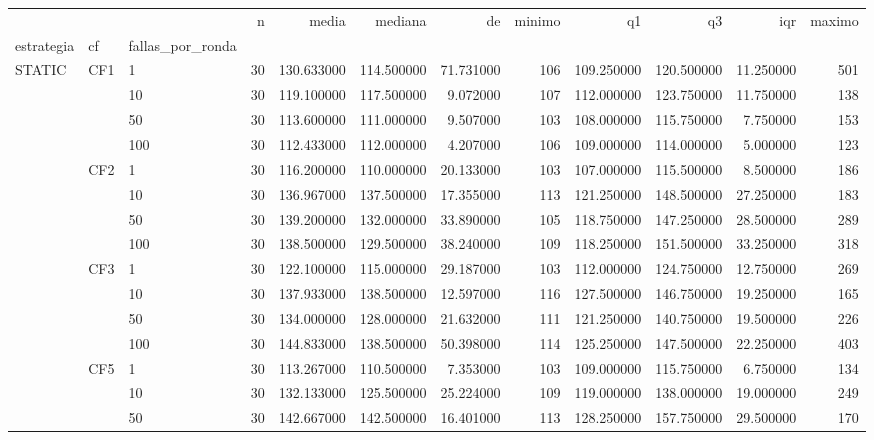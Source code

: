 \begin{tabular}{lllrrrrrrrrr}
\toprule
 &  &  & n & media & mediana & de & minimo & q1 & q3 & iqr & maximo \\
estrategia & cf & fallas_por_ronda &  &  &  &  &  &  &  &  &  \\
\midrule
\multirow[t]{16}{*}{STATIC} & \multirow[t]{4}{*}{CF1} & 1 & 30 & 130.633000 & 114.500000 & 71.731000 & 106 & 109.250000 & 120.500000 & 11.250000 & 501 \\
 &  & 10 & 30 & 119.100000 & 117.500000 & 9.072000 & 107 & 112.000000 & 123.750000 & 11.750000 & 138 \\
 &  & 50 & 30 & 113.600000 & 111.000000 & 9.507000 & 103 & 108.000000 & 115.750000 & 7.750000 & 153 \\
 &  & 100 & 30 & 112.433000 & 112.000000 & 4.207000 & 106 & 109.000000 & 114.000000 & 5.000000 & 123 \\
\cline{2-12}
 & \multirow[t]{4}{*}{CF2} & 1 & 30 & 116.200000 & 110.000000 & 20.133000 & 103 & 107.000000 & 115.500000 & 8.500000 & 186 \\
 &  & 10 & 30 & 136.967000 & 137.500000 & 17.355000 & 113 & 121.250000 & 148.500000 & 27.250000 & 183 \\
 &  & 50 & 30 & 139.200000 & 132.000000 & 33.890000 & 105 & 118.750000 & 147.250000 & 28.500000 & 289 \\
 &  & 100 & 30 & 138.500000 & 129.500000 & 38.240000 & 109 & 118.250000 & 151.500000 & 33.250000 & 318 \\
\cline{2-12}
 & \multirow[t]{4}{*}{CF3} & 1 & 30 & 122.100000 & 115.000000 & 29.187000 & 103 & 112.000000 & 124.750000 & 12.750000 & 269 \\
 &  & 10 & 30 & 137.933000 & 138.500000 & 12.597000 & 116 & 127.500000 & 146.750000 & 19.250000 & 165 \\
 &  & 50 & 30 & 134.000000 & 128.000000 & 21.632000 & 111 & 121.250000 & 140.750000 & 19.500000 & 226 \\
 &  & 100 & 30 & 144.833000 & 138.500000 & 50.398000 & 114 & 125.250000 & 147.500000 & 22.250000 & 403 \\
\cline{2-12}
 & \multirow[t]{4}{*}{CF5} & 1 & 30 & 113.267000 & 110.500000 & 7.353000 & 103 & 109.000000 & 115.750000 & 6.750000 & 134 \\
 &  & 10 & 30 & 132.133000 & 125.500000 & 25.224000 & 109 & 119.000000 & 138.000000 & 19.000000 & 249 \\
 &  & 50 & 30 & 142.667000 & 142.500000 & 16.401000 & 113 & 128.250000 & 157.750000 & 29.500000 & 170 \\

\end{tabular}
